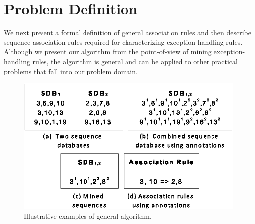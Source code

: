 \section{Problem Definition}
\label{sec:condrules}
\vspace*{-2ex}
We next present a formal definition of general association rules 
and then describe sequence association rules required
for characterizing exception-handling rules. Although we present
our algorithm from the point-of-view of mining exception-handling rules, the algorithm
is general and can be applied to other practical problems that fall into our problem domain.

\begin{figure}[t]
\centering
\includegraphics[scale=0.70,clip]{figs/conditionalassorules1.eps}\vspace*{-3ex}
\centering \caption {Illustrative examples of general algorithm.\label{fig:condassorules}}\vspace*{-4ex}
\end{figure}

